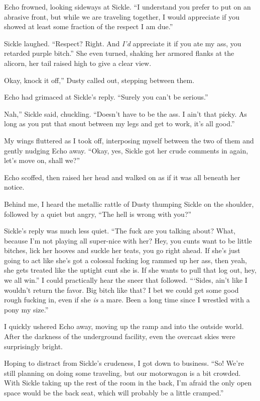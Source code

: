 Echo frowned, looking sideways at Sickle. “I understand you prefer to put on an abrasive front, but while we are traveling together, I would appreciate if you showed at least some fraction of the respect I am due.”

Sickle laughed. “Respect? Right. And \textit{I’d} appreciate it if you ate my ass, you retarded purple bitch.” She even turned, shaking her armored flanks at the alicorn, her tail raised high to give a clear view.

\leavevmode{}Okay, knock it off,” Dusty called out, stepping between them.

Echo had grimaced at Sickle’s reply. “Surely you can’t be serious.”

\leavevmode{}Nah,” Sickle said, chuckling. “Doesn’t have to be the ass. I ain’t that picky. As long as you put that snout between my legs and get to work, it’s all good.”

My wings fluttered as I took off, interposing myself between the two of them and gently nudging Echo away. “Okay, yes, Sickle got her crude comments in again, let’s move on, shall we?”

Echo scoffed, then raised her head and walked on as if it was all beneath her notice.

Behind me, I heard the metallic rattle of Dusty thumping Sickle on the shoulder, followed by a quiet but angry, “The hell is wrong with you?”

Sickle’s reply was much less quiet. “The fuck are you talking about? What, because I’m not playing all super-nice with her? Hey, you cunts want to be little bitches, lick her hooves and suckle her teats, you go right ahead. If she’s just going to act like she’s got a colossal fucking log rammed up her ass, then yeah, she gets treated like the uptight cunt she is. If she wants to pull that log out, hey, we all win.” I could practically hear the sneer that followed. “‘Sides, ain’t like I wouldn’t return the favor. Big bitch like that? I bet we could get some good rough fucking in, even if she \textit{is} a mare. Been a long time since I wrestled with a pony my size.”

I quickly ushered Echo away, moving up the ramp and into the outside world. After the darkness of the underground facility, even the overcast skies were surprisingly bright.

Hoping to distract from Sickle’s crudeness, I got down to business. “So! We’re still planning on doing some traveling, but our motorwagon is a bit crowded. With Sickle taking up the rest of the room in the back, I’m afraid the only open space would be the back seat, which will probably be a little cramped.”

